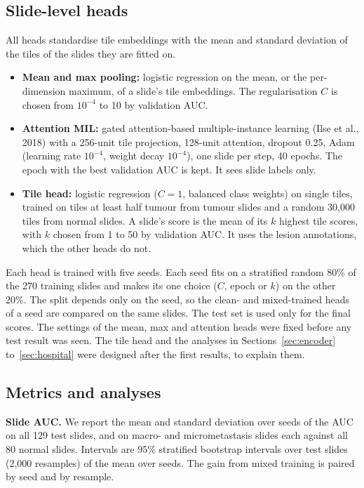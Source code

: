 \documentclass[11pt,a4paper]{article}
\begin{document}
\subsection{Slide-level heads}

All heads standardise tile embeddings with the mean and standard deviation of the tiles of the slides they are fitted on.

\begin{itemize}
\item \textbf{Mean and max pooling:} logistic regression on the mean, or the per-dimension maximum, of a slide's tile embeddings. The regularisation $C$ is chosen from $10^{-4}$ to 10 by validation AUC.
\item \textbf{Attention MIL:} gated attention-based multiple-instance learning (Ilse et al., 2018) with a 256-unit tile projection, 128-unit attention, dropout 0.25, Adam (learning rate $10^{-4}$, weight decay $10^{-4}$), one slide per step, 40 epochs. The epoch with the best validation AUC is kept. It sees slide labels only.
\item \textbf{Tile head:} logistic regression ($C = 1$, balanced class weights) on single tiles, trained on tiles at least half tumour from tumour slides and a random 30,000 tiles from normal slides. A slide's score is the mean of its $k$ highest tile scores, with $k$ chosen from 1 to 50 by validation AUC. It uses the lesion annotations, which the other heads do not.
\end{itemize}

Each head is trained with five seeds. Each seed fits on a stratified random 80\% of the 270 training slides and makes its one choice ($C$, epoch or $k$) on the other 20\%. The split depends only on the seed, so the clean- and mixed-trained heads of a seed are compared on the same slides. The test set is used only for the final scores. The settings of the mean, max and attention heads were fixed before any test result was seen. The tile head and the analyses in Sections~\ref{sec:encoder} to~\ref{sec:hospital} were designed after the first results, to explain them.

\subsection{Metrics and analyses}

\textbf{Slide AUC.} We report the mean and standard deviation over seeds of the AUC on all 129 test slides, and on macro- and micrometastasis slides each against all 80 normal slides. Intervals are 95\% stratified bootstrap intervals over test slides (2,000 resamples) of the mean over seeds. The gain from mixed training is paired by seed and by resample.
\end{document}
